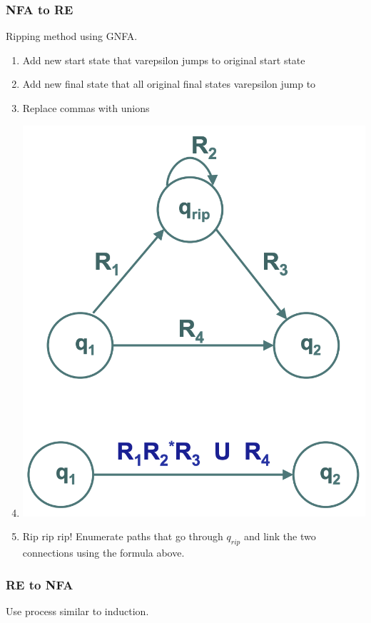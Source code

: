\documentclass{article}
\begin{document}
\subsubsection{NFA to RE}
Ripping method using GNFA.

\begin{enumerate}
    \item Add new start state that varepsilon jumps to original start state
    \item Add new final state that all original final states varepsilon jump to 
    \item Replace commas with unions
    \item \begin{minipage}[t]{\linewidth}
    \includegraphics[scale=0.25]{rip.png}
    \end{minipage}
    \item Rip rip rip! Enumerate paths that go through $q_{rip}$ and link the two connections using the formula above.
\end{enumerate}

\subsubsection{RE to NFA}
Use process similar to induction.
\end{document}
